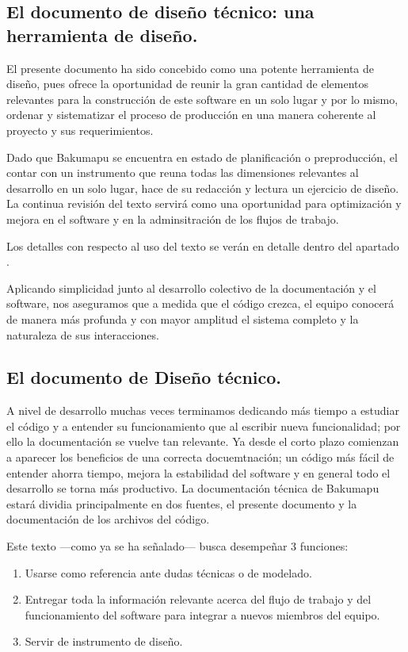 
\subsection{El documento de diseño técnico: una herramienta de diseño.}\label{principios:documento-tecnico-como-herramienta}
El presente documento ha sido concebido como una potente herramienta de diseño, pues ofrece la oportunidad de reunir la gran cantidad de elementos relevantes para la construcción de este software en un solo lugar y por lo mismo, ordenar y sistematizar el proceso de producción en una manera coherente al proyecto y sus requerimientos.

Dado que Bakumapu se encuentra en estado de planificación o preproducción, el contar con un instrumento que reuna todas las dimensiones relevantes al desarrollo en un solo lugar, hace de su redacción y lectura un ejercicio de diseño. La continua revisión del texto servirá como una oportunidad para optimización y mejora en el software y en la adminsitración de los flujos de trabajo.

Los detalles con respecto al uso del texto se verán en detalle dentro del apartado .

Aplicando simplicidad junto al desarrollo colectivo de la documentación y el software, nos aseguramos que a medida que el código crezca, el equipo conocerá de manera más profunda y con mayor amplitud el sistema completo y la naturaleza de sus interacciones.



\subsection{El documento de Diseño técnico.}\label{flujo:documento-de-diseno}
A nivel de desarrollo muchas veces terminamos dedicando más tiempo a estudiar el código y a entender su funcionamiento que al escribir nueva funcionalidad; por ello la documentación se vuelve tan relevante. Ya desde el corto plazo comienzan a aparecer los beneficios de una correcta docuemtnación; un código más fácil de entender ahorra tiempo, mejora la estabilidad del software y en general todo el desarrollo se torna más productivo. La documentación técnica de Bakumapu estará dividia principalmente en dos fuentes, el presente documento y la documentación de los archivos del código. 

Este texto ---como ya se ha señalado--- busca desempeñar 3 funciones:
\begin{enumerate}
	\item Usarse como referencia ante dudas técnicas o de modelado.
	\item Entregar toda la información relevante acerca del flujo de trabajo y del funcionamiento del software para integrar a nuevos miembros del equipo.
	\item Servir de instrumento de diseño.
\end{enumerate}

